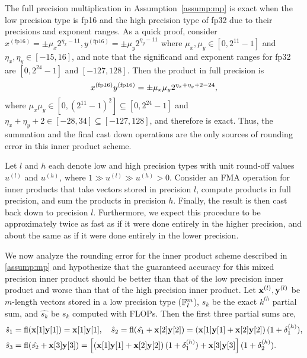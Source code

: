 The full precision multiplication in Assumption~\ref{assump:mp} is exact when the low precision type is fp16 and the high precision type of fp32 due to their precisions and exponent ranges. 
As a quick proof, consider $x^{(\text{fp16})} = \pm\mu_x2^{\eta_x -11},y^{(\text{fp16})} = \pm\mu_y2^{\eta_y -11}$ where $\mu_x,\mu_y\in[0,2^{11}-1]$ and $\eta_x,\eta_y\in[-15,16]$, and note that the significand and exponent ranges for fp32 are $[0, 2^{24}-1]$ and $[-127,128]$.
Then the product in full precision is
\[\footnotesize x^{(\text{fp16})}y^{(\text{fp16})} = \pm\mu_x\mu_y 2^{\eta_x+\eta_y+2-24},\]
where  $\mu_x\mu_y \in[0,(2^{11}-1)^2] \subseteq [0,2^{24}-1]$ and $\eta_x+\eta_y +2\in[-28,34]\subseteq[-127,128]$, and therefore is exact.
Thus, the summation and the final cast down operations are the only sources of rounding error in this inner product scheme.
\begin{assump}
	\label{assump:mp}
	Let $l$ and $h$ each denote low and high precision types with unit round-off values $u^{(l)}$ and $u^{(h)}$, where $1 \gg u^{(l)} \gg u^{(h)} >0$.
	Consider an FMA operation for inner products that take vectors stored in precision $l$, compute products in full precision, and sum the products in precision $h$. 
	Finally, the result is then cast back down to precision $l$.
	Furthermore, we expect this procedure to be approximately twice as fast as if it were done entirely in the higher precision, and about the same as if it were done entirely in the lower precision. 
\end{assump}
We now analyze the rounding error for the inner product scheme described in \cref{assump:mp} and hypothesize that the guaranteed accuracy for this mixed precision inner product should be better than that of the low precision inner product and worse than that of the high precision inner product.
Let $\mathbf{x}^{(l)},\mathbf{y}^{(l)}$ be $m$-length vectors stored in a low precision type ($\mathbb{F}_l^m$), $s_k$ be the exact $k^{th}$ partial sum, and $\hat{s_k}$ be $s_k$ computed with FLOPs.
Then the first three partial sums are,
\begin{align*}
\hat{s}_1 &= \mathrm{fl} (\mathbf{x}[1]\mathbf{y}[1]) = \mathbf{x}[1]\mathbf{y}[1],\quad \hat{s}_2 = \mathrm{fl}(\hat{s_1} + \mathbf{x}[2]\mathbf{y}[2]) = \left(\mathbf{x}[1]\mathbf{y}[1]+ \mathbf{x}[2]\mathbf{y}[2]\right)(1+\delta_{1}^{(h)}),\\
\hat{s}_3 &= \mathrm{fl}(\hat{s_2}+\mathbf{x}[3]\mathbf{y}[3]) = \left[\left(\mathbf{x}[1]\mathbf{y}[1] + \mathbf{x}[2]\mathbf{y}[2]\right)(1+\delta_{1}^{(h)})  + \mathbf{x}[3]\mathbf{y}[3]\right](1+\delta_{2}^{(h)}).
\end{align*}
